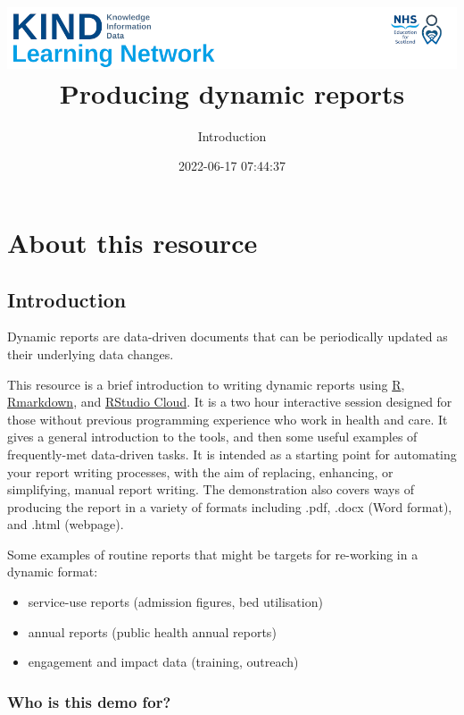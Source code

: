 \documentclass[
]{article}
\title{\includegraphics{./4cf3a1be231a55e00832f18f22d4480eeb96ac94.png}
Producing dynamic reports}
\subtitle{Introduction}
\author{}
\date{\vspace{-2.5em}2022-06-17 07:44:37}
\providecommand{\tightlist}{%
  \setlength{\itemsep}{0pt}\setlength{\parskip}{0pt}}
\begin{document}
\maketitle

{
\setcounter{tocdepth}{2}
\tableofcontents
}
\hypertarget{about-this-resource}{%
\section{About this resource}\label{about-this-resource}}

\hypertarget{introduction}{%
\subsection{Introduction}\label{introduction}}

Dynamic reports are data-driven documents that can be periodically
updated as their underlying data changes.

This resource is a brief introduction to writing dynamic reports using
\href{https://www.r-project.org/}{R},
\href{http://rmarkdown.rstudio.com}{Rmarkdown}, and
\href{https://rstudio.cloud}{RStudio Cloud}. It is a two hour
interactive session designed for those without previous programming
experience who work in health and care. It gives a general introduction
to the tools, and then some useful examples of frequently-met
data-driven tasks. It is intended as a starting point for automating
your report writing processes, with the aim of replacing, enhancing, or
simplifying, manual report writing. The demonstration also covers ways
of producing the report in a variety of formats including .pdf, .docx
(Word format), and .html (webpage).

Some examples of routine reports that might be targets for re-working in
a dynamic format:

\begin{itemize}
\tightlist
\item
  service-use reports (admission figures, bed utilisation)
\item
  annual reports (public health annual reports)
\item
  engagement and impact data (training, outreach)
\end{itemize}

\hypertarget{who-is-this-demo-for}{%
\subsubsection{Who is this demo for?}\label{who-is-this-demo-for}}
\end{document}
